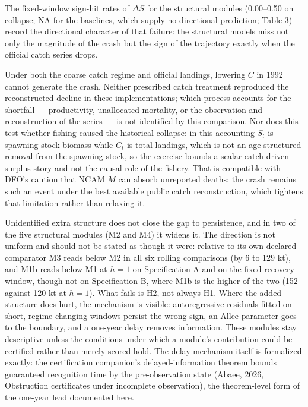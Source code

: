 \documentclass[11pt]{article}
\begin{document}
The fixed-window sign-hit rates of \(\Delta S\) for the structural
modules (0.00--0.50 on collapse; NA for the baselines, which supply no
directional prediction; Table 3) record the directional character of that failure: the
structural models miss not only the magnitude of the crash but the sign
of the trajectory exactly when the official catch series drops.

Under both the coarse catch regime and official landings, lowering \(C\)
in 1992 cannot generate the crash. Neither prescribed catch treatment reproduced the reconstructed decline
in these implementations; which process accounts for the shortfall ---
productivity, unallocated mortality, or the observation and
reconstruction of the series --- is not identified by this comparison.
Nor does this test whether fishing caused the historical collapse: in
this accounting \(S_t\) is spawning-stock biomass while \(C_t\) is total
landings, which is not an age-structured removal from the spawning
stock, so the exercise bounds a scalar catch-driven surplus story and
not the causal role of the fishery. That is
compatible with DFO's caution that NCAM \(M\) can absorb unreported
deaths: the crash remains such an event under the best available public
catch reconstruction, which tightens that limitation rather than
relaxing it.

Unidentified extra structure does not close the gap to persistence, and
in two of the five structural modules (M2 and M4) it widens it. The direction is not uniform
and should not be stated as though it were: relative to its own declared
comparator M3 reads below M2 in all six rolling comparisons (by 6 to 129
kt), and M1b reads below M1 at \(h=1\) on Specification A and on the
fixed recovery window, though not on Specification B, where M1b is the
higher of the two (152 against 120 kt at \(h=1\)). What fails is H2, not always H1. Where the added
structure does hurt, the mechanism is visible: autoregressive residuals
fitted on short, regime-changing windows persist the wrong sign, an
Allee parameter goes to the boundary, and a one-year delay removes
information. These modules stay descriptive unless the conditions under
which a module's contribution could be certified rather than merely
scored hold. The delay mechanism itself is formalized exactly: the
certification companion's delayed-information theorem bounds guaranteed
recognition time by the pre-observation state (Abaee, 2026, Obstruction certificates under incomplete observation), the
theorem-level form of the one-year lead documented here.
\end{document}
